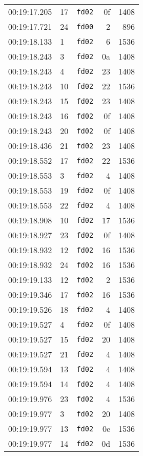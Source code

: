 \documentclass{article}
\begin{document}
\begin{longtable}{lllrr}
00:19:17.205 & 17 & \texttt{fd02} & 0f & 1408 \\
00:19:17.721 & 24 & \texttt{fd00} & 2 & 896 \\
00:19:18.133 & 1 & \texttt{fd02} & 6 & 1536 \\
00:19:18.243 & 3 & \texttt{fd02} & 0a & 1408 \\
00:19:18.243 & 4 & \texttt{fd02} & 23 & 1408 \\
00:19:18.243 & 10 & \texttt{fd02} & 22 & 1536 \\
00:19:18.243 & 15 & \texttt{fd02} & 23 & 1408 \\
00:19:18.243 & 16 & \texttt{fd02} & 0f & 1408 \\
00:19:18.243 & 20 & \texttt{fd02} & 0f & 1408 \\
00:19:18.436 & 21 & \texttt{fd02} & 23 & 1408 \\
00:19:18.552 & 17 & \texttt{fd02} & 22 & 1536 \\
00:19:18.553 & 3 & \texttt{fd02} & 4 & 1408 \\
00:19:18.553 & 19 & \texttt{fd02} & 0f & 1408 \\
00:19:18.553 & 22 & \texttt{fd02} & 4 & 1408 \\
00:19:18.908 & 10 & \texttt{fd02} & 17 & 1536 \\
00:19:18.927 & 23 & \texttt{fd02} & 0f & 1408 \\
00:19:18.932 & 12 & \texttt{fd02} & 16 & 1536 \\
00:19:18.932 & 24 & \texttt{fd02} & 16 & 1536 \\
00:19:19.133 & 12 & \texttt{fd02} & 2 & 1536 \\
00:19:19.346 & 17 & \texttt{fd02} & 16 & 1536 \\
00:19:19.526 & 18 & \texttt{fd02} & 4 & 1408 \\
00:19:19.527 & 4 & \texttt{fd02} & 0f & 1408 \\
00:19:19.527 & 15 & \texttt{fd02} & 20 & 1408 \\
00:19:19.527 & 21 & \texttt{fd02} & 4 & 1408 \\
00:19:19.594 & 13 & \texttt{fd02} & 4 & 1408 \\
00:19:19.594 & 14 & \texttt{fd02} & 4 & 1408 \\
00:19:19.976 & 23 & \texttt{fd02} & 4 & 1536 \\
00:19:19.977 & 3 & \texttt{fd02} & 20 & 1408 \\
00:19:19.977 & 13 & \texttt{fd02} & 0e & 1536 \\
00:19:19.977 & 14 & \texttt{fd02} & 0d & 1536 \\

\end{longtable}
\end{document}
